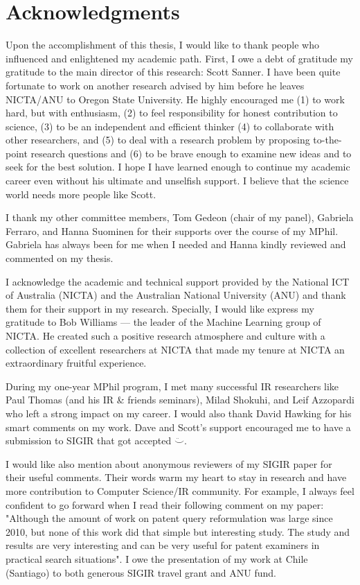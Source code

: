 \chapter*{Acknowledgments}

Upon the accomplishment of this thesis, I would like to thank people who influenced and enlightened my academic path. 
First, I owe a debt of gratitude my gratitude to the main director of this research: Scott Sanner. I have been quite fortunate to work on another research advised by him before he leaves NICTA/ANU to Oregon State University. He highly encouraged me  (1) to work hard, but with enthusiasm, (2) to feel responsibility for honest contribution to science, (3) to be an independent and efficient thinker (4)  to collaborate with other researchers, and (5) to deal with a research problem by proposing to-the-point research questions and (6) to be brave enough to examine new ideas and to seek for the best solution. I hope I have learned enough to continue my academic career even without his ultimate and unselfish support. I believe that the science world needs more people like Scott. 

I thank my other committee members, Tom Gedeon (chair of my panel), Gabriela Ferraro, and Hanna Suominen for their supports over the course of my MPhil. Gabriela has always been for me when I needed and Hanna kindly reviewed and commented on my thesis. 

I acknowledge the academic and technical support provided by the
National ICT of Australia (NICTA) and the Australian National University (ANU)
and thank them for their support in my research. Specially, I would like express my gratitude to Bob Williams --- the leader of the Machine Learning group of NICTA. He created such a positive research atmosphere and culture with a collection of excellent researchers at NICTA that made my tenure at NICTA an extraordinary fruitful experience.

During my one-year MPhil program, I met many successful IR researchers like Paul Thomas (and his IR \& friends seminars), Milad Shokuhi, and Leif Azzopardi who left a strong impact on my career. I would also thank David Hawking for his smart comments on my work. Dave and Scott's support encouraged me to have a submission to SIGIR that got accepted $\ddot\smile$. 

I would like also mention about anonymous reviewers of my SIGIR paper  for their useful comments. Their words warm my heart to stay in research and have more contribution to Computer Science/IR community. For example, I always feel confident to go forward when I read their following comment on my paper: "Although the amount of work on patent query reformulation was large since 2010, but none of this work did that simple but interesting study. The study and results are very interesting and can be very useful for patent examiners in practical search situations". I owe the presentation of my work at Chile (Santiago) to both generous SIGIR travel grant and ANU fund. 


